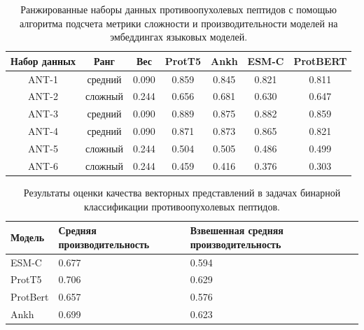 \documentclass[specification,annotation,times]{itmo-student-thesis}
\begin{document}
\begin{table}[h]
\centering
\caption{Ранжированные наборы данных противоопухолевых пептидов с помощью алгоритма подсчета метрики сложности и производительности моделей на эмбеддингах языковых моделей.}
\label{tab:model_performance_ant}

\begin{tabular}{|c|c|c|c|c|c|c|}
\hline
Набор данных & Ранг & Вес & ProtT5 & Ankh & ESM-C & ProtBERT \\
\hline
ANT-1 & средний & 0.090 & 0.859 & 0.845 & 0.821 & 0.811 \\ \hline
ANT-2 & сложный & 0.244 & 0.656 & 0.681 & 0.630 & 0.647 \\ \hline
ANT-3 & средний & 0.090 & 0.889 & 0.875 & 0.882 & 0.859 \\ \hline
ANT-4 & средний & 0.090 & 0.871 & 0.873 & 0.865 & 0.821 \\ \hline
ANT-5 & сложный & 0.244 & 0.504 & 0.505 & 0.486 & 0.499 \\ \hline
ANT-6 & сложный & 0.244 & 0.459 & 0.416 & 0.376 & 0.303 \\ \hline
\end{tabular}

\end{table}


\begin{table}[h]
\centering

\caption{Результаты оценки качества векторных представлений в задачах бинарной классификации противоопухолевых пептидов.}
\label{tab:compare_results_ant}
\begin{tabular}{|p{3cm}|p{5cm}|p{5cm}|}
\hline
Модель & Средняя \newline производительность & Взвешенная \newline средняя \newline производительность \\
\hline
ESM-C & 0.677 & 0.594 \\ \hline
ProtT5 & 0.706 & 0.629 \\ \hline
ProtBert & 0.657 & 0.576 \\ \hline
Ankh & 0.699 & 0.623 \\ \hline
\end{tabular}

\end{table}
\end{document}
